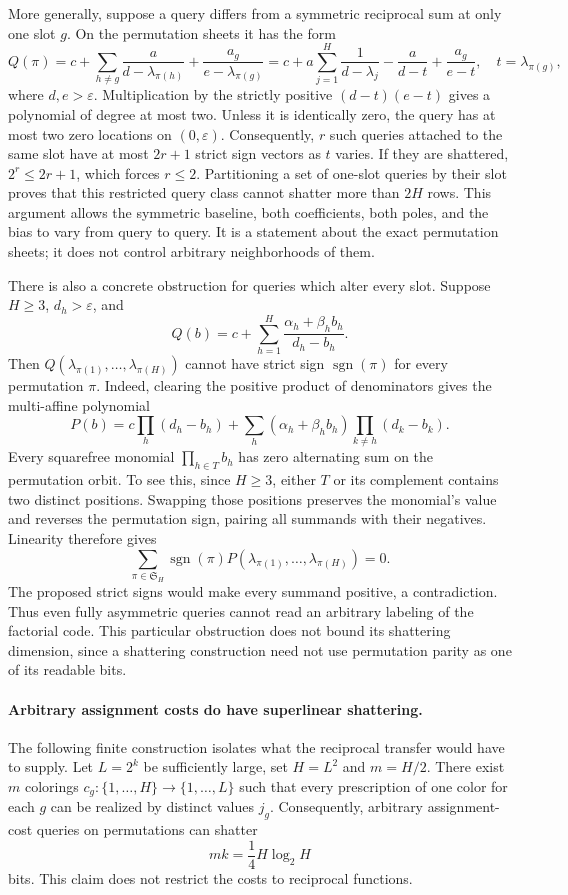 \documentclass[11pt]{article}
\begin{document}
More generally, suppose a query differs from a symmetric reciprocal sum
at only one slot $g$. On the permutation sheets it has the form
\[
 Q(\pi)=c+\sum_{h\ne g}\frac{a}{d-\lambda_{\pi(h)}}
                 +\frac{a_g}{e-\lambda_{\pi(g)}}
 =c+a\sum_{j=1}^H\frac1{d-\lambda_j}
       -\frac{a}{d-t}+\frac{a_g}{e-t},
 \quad t=\lambda_{\pi(g)},
\]
where $d,e>\varepsilon$. Multiplication by the strictly positive
$(d-t)(e-t)$ gives a polynomial of degree at most two. Unless it is
identically zero, the query has at most two zero locations on
$(0,\varepsilon)$. Consequently, $r$ such queries attached to the same
slot have at most $2r+1$ strict sign vectors as $t$ varies. If they are
shattered, $2^r\le2r+1$, which forces $r\le2$. Partitioning a set of
one-slot queries by their slot proves that this restricted query class
cannot shatter more than $2H$ rows. This argument allows the symmetric
baseline, both coefficients, both poles, and the bias to vary from
query to query. It is a statement about the exact permutation sheets;
it does not control arbitrary neighborhoods of them.

There is also a concrete obstruction for queries which alter every
slot. Suppose $H\ge3$, $d_h>\varepsilon$, and
\[
 Q(b)=c+\sum_{h=1}^H\frac{\alpha_h+\beta_h b_h}{d_h-b_h}.
\]
Then $Q(\lambda_{\pi(1)},\ldots,\lambda_{\pi(H)})$ cannot have
strict sign $\operatorname{sgn}(\pi)$ for every permutation $\pi$.
Indeed, clearing the positive product of denominators gives the
multi-affine polynomial
\[
 P(b)=c\prod_h(d_h-b_h)
       +\sum_h(\alpha_h+\beta_h b_h)\prod_{k\ne h}(d_k-b_k).
\]
Every squarefree monomial $\prod_{h\in T}b_h$ has zero alternating
sum on the permutation orbit. To see this, since $H\ge3$, either $T$
or its complement contains two distinct positions. Swapping those
positions preserves the monomial's value and reverses the permutation
sign, pairing all summands with their negatives. Linearity therefore
gives
\[
 \sum_{\pi\in\mathfrak S_H}\operatorname{sgn}(\pi)
 P(\lambda_{\pi(1)},\ldots,\lambda_{\pi(H)})=0.
\]
The proposed strict signs would make every summand positive, a
contradiction. Thus even fully asymmetric queries cannot read an
arbitrary labeling of the factorial code. This particular obstruction
does not bound its shattering dimension, since a shattering construction
need not use permutation parity as one of its readable bits.

\paragraph{Arbitrary assignment costs do have superlinear shattering.}
The following finite construction isolates what the reciprocal transfer
would have to supply. Let $L=2^k$ be sufficiently large, set $H=L^2$
and $m=H/2$. There exist $m$ colorings
$c_g:\{1,\ldots,H\}\to\{1,\ldots,L\}$ such that every prescription
of one color for each $g$ can be realized by distinct values $j_g$.
Consequently, arbitrary assignment-cost queries on permutations can
shatter
\[
 mk=\frac14H\log_2H
\]
bits. This claim does not restrict the costs to reciprocal functions.
\end{document}
